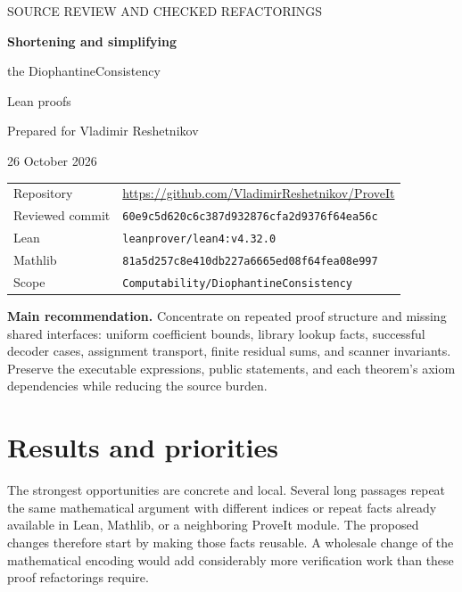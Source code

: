 \documentclass[11pt,letterpaper]{article}
\begin{document}
\begin{titlepage}
\vspace*{0.7in}
{\Large\sffamily\color{accent} SOURCE REVIEW AND CHECKED REFACTORINGS\par}
\vspace{0.35in}
{\Huge\sffamily\bfseries\color{ink} Shortening and simplifying\par
the DiophantineConsistency\par Lean proofs\par}
\vspace{0.45in}
{\large Prepared for Vladimir Reshetnikov\par}
{\large 26 October 2026\par}
\vspace{0.4in}
\begin{tabularx}{\textwidth}{@{}lX@{}}
\toprule
Repository & \url{https://github.com/VladimirReshetnikov/ProveIt}\\
Reviewed commit & \texttt{60e9c5d620c6c387d932876cfa2d9376f64ea56c}\\
Lean & \texttt{leanprover/lean4:v4.32.0}\\
Mathlib & \texttt{81a5d257c8e410db227a6665ed08f64fea08e997}\\
Scope & \texttt{Computability/DiophantineConsistency}\\
\bottomrule
\end{tabularx}
\vfill
\colorbox{pale}{\parbox{0.94\textwidth}{\textbf{Main recommendation.}
Concentrate on repeated proof structure and missing shared interfaces:
uniform coefficient bounds, library lookup facts, successful decoder cases,
assignment transport, finite residual sums, and scanner invariants.
Preserve the executable expressions, public statements, and each theorem's
axiom dependencies while reducing the source burden.}}
\vspace{0.2in}
\end{titlepage}

\tableofcontents
\newpage

\section{Results and priorities}

The strongest opportunities are concrete and local. Several long passages
repeat the same mathematical argument with different indices or repeat
facts already available in Lean, Mathlib, or a neighboring ProveIt module.
The proposed changes therefore start by making those facts reusable. A
wholesale change of the mathematical encoding would add considerably more
verification work than these proof refactorings require.
\end{document}
